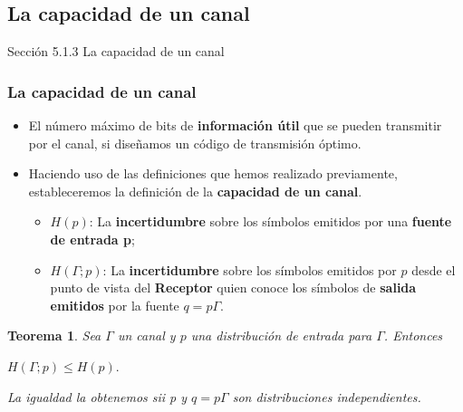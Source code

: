 \documentclass{beamer}
\theoremstyle{plain}
\newtheorem{teorema} [Teorema] {Teorema}
\theoremstyle{example}
\theoremstyle{example}
\begin{document}



\subsection{La capacidad de un canal}


\begin{frame}   \footnotesize
{
\begin{block}{Sección 5.1.3}
La capacidad de un canal
\end{block}
}
\end{frame} 


\begin{frame}  \frametitle{La capacidad de un canal}\small  
\begin{itemize}  

\item El número máximo de bits de \textbf{información útil} que se pueden transmitir por el canal, si diseñamos un código de transmisión óptimo.



\item Haciendo uso de las definiciones que hemos realizado previamente, estableceremos la definición de la \textbf{capacidad de un canal}.


\begin{itemize}
\item $H(p)$: La \textbf{incertidumbre} sobre los símbolos emitidos por una \textbf{fuente de entrada p};
\item $H (\Gamma ; p)$:  La \textbf{incertidumbre} sobre los símbolos emitidos por $p$ desde el punto de vista del \textbf{Receptor} quien conoce los símbolos de \textbf{salida emitidos} por la fuente $q=p\Gamma$.
\end{itemize}

\end{itemize} 


\vspace{0.3cm}
\begin{teorema}

Sea $\Gamma$ un canal y $p$ una distribución de entrada para $\Gamma$. Entonces

 \begin{center}
$H(\Gamma ;p) \leq H(p).$
\end{center}

La igualdad la obtenemos sii p y $q = p\Gamma$ son distribuciones independientes.

\end{teorema}

\end{frame} 
\end{document}
